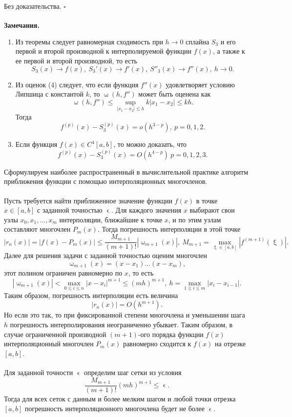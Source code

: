 \documentclass[a4paper, 12pt]{report}
\numberwithin{equation}{section}
\newenvironment{Proof} %
{\par\noindent{$\blacklozenge$}} %
{\hfill$\scriptstyle\square$}
\renewcommand{\leq}{\leqslant}
\renewcommand{\omega}{\upomega}
\renewcommand{\xi}{\upxi}
\renewcommand{\varepsilon}{\upvarepsilon}
\begin{document}
	 \begin{Proof}
	 	Без доказательства.
	 \end{Proof}\\\\
	 \textbf{Замечания.}\begin{enumerate}
	 	\item Из теоремы следует равномерная сходимость при $h\to 0$ сплайна $S_3$ и его первой и второй производной к интерполируемой функции $f(x)$, а также к ее первой и второй производной, то есть $$S_3(x) \to f(x),\ S_3'(x) \to f'(x),\ S''_3(x)\to f''(x),\ h\to 0.$$
	 	\item Из оценок (4) следует, что если функция $f''(x)$ удовлетворяет условию Липшица с константой $k$, то $\omega (h,f'')$ может быть оценена как $$\omega(h, f'') \leq \underset{|x_1-x_2| \leq h}{\sup} k|x_1 - x_2|\leq kh.$$
	 	Тогда $$f^{(p)}(x) - S^{(p)}_3(x) = o(h^{3-p}),\ p=0,1,2.$$
	 	\item Если функция $f(x)\in C^4[a,b]$, то можно доказать, что $$f^{(p)}(x) - S_3^{(p)}(x) = O(h^{4-p}) \ p=0,1,2,3.$$
	 \end{enumerate}
	 Сформулируем наиболее распространенный в вычислительной практике алгоритм приближения функции с помощью интерполяционных многочленов.\\\\
	 Пусть требуется найти приближенное значение функции $f(x)$ в точке $x\in [a,b]$ с заданной точностью $\varepsilon$. Для каждого значения $x$ выбирают свои узлы $x_0, x_1,\ldots, x_m$ интерполяции, ближайшие к точке $x$, и по этим узлам составляют многочлен $P_m(x)$. Тогда погрешность интерполяции в этой точке $$|r_n(x)| = |f(x) - P_m(x)| \leq \dfrac{M_{m+1}}{(m+1)!}|\omega_{m+1}(x)|,\ M_{m+1} = \underset{\xi \in [a,b]}{\max}|f^{(m+1)} (\xi)|.$$
	 Далее для решения задачи с заданной точностью оценим многочлен
	 $$\omega_{m+1}(x) = (x-x_1)\ldots (x-x_m),$$
	 этот полином ограничен равномерно по $x$, то есть $$|\omega_{m+1}(x)| < \underset{0 \leq i \leq n}{\max}|x-x_i|^{m+1}\leq (mh)^{m+1},\ h = \underset{1 \leq i \leq m}{\max}|x_{i} - x_{i-1}|.$$
	 Таким образом, погрешность интерполяции есть величина $$|r_n(x)| = O(h^{m+1}).$$
	 Но если это так, то при фиксированной степени многочлена и уменьшении шага $h$ погрешность интерполирования неограниченно убывает. Таким образом, в случае ограниченной производной $({m+1})$-ого порядка функции $f(x)$ интерполяционный многочлен $P_m(x)$ равномерно сходится к $f(x)$ на отрезке $[a,b]$.\\\\
	 Для заданной точности $\varepsilon$ определим шаг сетки из условия $$\dfrac{M_{m+1}}{(m+1)!}(mh)^{m+1}\leq \varepsilon.$$
	 Тогда для всех сеток с данным и более мелким шагом и любой точки отрезка $[a,b]$ погрешность интерполяционного многочлена будет не более $\varepsilon$.
\end{document}
